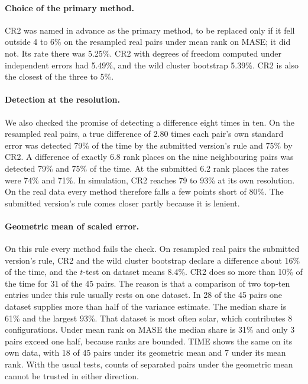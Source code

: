 \documentclass{article}
\begin{document}
\paragraph{Choice of the primary method.} CR2 was named in advance as the primary method, to
be replaced only if it fell outside 4 to 6\% on the resampled real pairs under mean rank on
MASE; it did not. Its rate there was 5.25\%. CR2 with degrees of freedom computed under
independent errors had 5.49\%, and the wild cluster bootstrap 5.39\%. CR2 is also the closest
of the three to 5\%.

\paragraph{Detection at the resolution.} We also checked the promise of detecting a
difference eight times in ten. On the resampled real pairs, a true difference of 2.80 times
each pair's own standard error was detected 79\% of the time by the submitted version's rule
and 75\% by CR2. A difference of exactly 6.8 rank places on the nine neighbouring pairs was
detected 79\% and 75\% of the time. At the submitted 6.2 rank places the rates were 74\% and
71\%. In simulation, CR2 reaches 79 to 93\% at its own resolution. On the real data every
method therefore falls a few points short of 80\%. The submitted version's rule comes closer
partly because it is lenient.

\paragraph{Geometric mean of scaled error.} On this rule every method fails the check. On
resampled real pairs the submitted version's rule, CR2 and the wild cluster bootstrap declare a
difference about 16\% of the time, and the $t$-test on dataset means 8.4\%. CR2 does so more
than 10\% of the time for 31 of the 45 pairs. The reason is that a comparison
of two top-ten entries under this rule usually rests on one dataset. In 28 of the 45 pairs one
dataset supplies more than half of the variance estimate. The median share is 61\% and the
largest 93\%. That dataset is most often solar, which contributes 8 configurations. Under mean
rank on MASE the median share is 31\% and only 3 pairs exceed one half, because ranks are
bounded. TIME shows the same on its own data, with 18 of 45 pairs under its geometric mean and
7 under its mean rank. With the usual tests, counts of separated pairs under the geometric
mean cannot be trusted in either direction.
\end{document}
